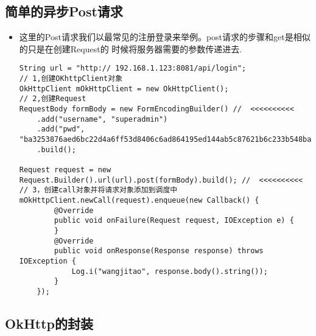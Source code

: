 \documentclass[9pt, b5paper]{article}
\begin{document}
\subsection{简单的异步Post请求}
\label{sec-13-2}
\begin{itemize}
\item 这里的Post请求我们以最常见的注册登录来举例。post请求的步骤和get是相似的只是在创建Request的 时候将服务器需要的参数传递进去.
\begin{verbatim}
String url = "http:// 192.168.1.123:8081/api/login";
// 1,创建OKhttpClient对象
OkHttpClient mOkHttpClient = new OkHttpClient();
// 2,创建Request
RequestBody formBody = new FormEncodingBuilder() //  <<<<<<<<<< 
    .add("username", "superadmin")
    .add("pwd", "ba3253876aed6bc22d4a6ff53d8406c6ad864195ed144ab5c87621b6c233b548baeae6956df346ec8c17f5ea10f35ee3cbc514797ed7ddd3145464e2a0bab413")
    .build();
 
Request request = new Request.Builder().url(url).post(formBody).build(); //  <<<<<<<<<< 
// 3，创建call对象并将请求对象添加到调度中
mOkHttpClient.newCall(request).enqueue(new Callback() {
        @Override
        public void onFailure(Request request, IOException e) {
        }
        @Override
        public void onResponse(Response response) throws IOException {
            Log.i("wangjitao", response.body().string());
        }
    });
\end{verbatim}
\end{itemize}
\subsection{OkHttp的封装}
\label{sec-13-3}
\end{document}
